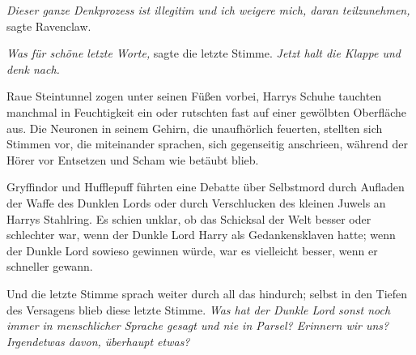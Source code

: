 \emph{Dieser ganze Denkprozess ist illegitim und ich weigere mich, daran teilzunehmen,} sagte Ravenclaw.

\emph{Was für schöne letzte Worte,} sagte die letzte Stimme. \emph{Jetzt halt die Klappe und denk nach.}

Raue Steintunnel zogen unter seinen Füßen vorbei, Harrys Schuhe tauchten manchmal in Feuchtigkeit ein oder rutschten fast auf einer gewölbten Oberfläche aus.
Die Neuronen in seinem Gehirn, die unaufhörlich feuerten, stellten sich Stimmen vor, die miteinander sprachen, sich gegenseitig anschrieen, während der Hörer vor Entsetzen und Scham wie betäubt blieb.

Gryffindor und Hufflepuff führten eine Debatte über Selbstmord durch Aufladen der Waffe des Dunklen Lords oder durch Verschlucken des kleinen Juwels an Harrys Stahlring. Es schien unklar, ob das Schicksal der Welt besser oder schlechter war, wenn der Dunkle Lord Harry als Gedankensklaven hatte; wenn der Dunkle Lord sowieso gewinnen würde, war es vielleicht besser, wenn er schneller gewann.

Und die letzte Stimme sprach weiter durch all das hindurch; selbst in den Tiefen des Versagens blieb diese letzte Stimme.
\emph{Was hat der Dunkle Lord sonst noch immer in menschlicher Sprache gesagt und nie in Parsel? Erinnern wir uns? Irgendetwas davon, überhaupt etwas?}

